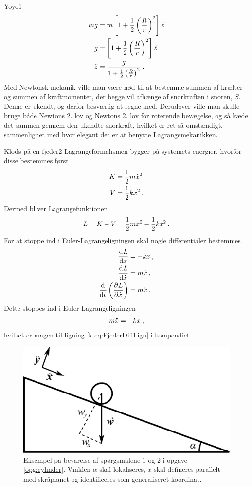 \begin{opgave}{Yoyo}{1}
\begin{align*}
	mg &= m\left[1 + \frac{1}{2}\left(\frac{R}{r}\right)^2\right]\ddt{z} \\
	g &= \left[1 + \frac{1}{2}\left(\frac{R}{r}\right)^2\right]\ddt{z} \\
	\ddt{z} &= \frac{g}{1 + \frac{1}{2}\left(\frac{R}{r}\right)^2} \: .
\end{align*}
\opg Med Newtonsk mekanik ville man være nød til at bestemme summen af kræfter og summen af kraftmomenter, der begge vil afhænge af snorkraften i snoren, $S$. Denne er ukendt, og derfor besværlig at regne med. Derudover ville man skulle bruge både Newtons 2. lov og Newtons 2. lov for roterende bevægelse, og så kæde det sammen gennem den ukendte snorkraft, hvilket er ret så omstændigt, sammenlignet med hvor elegant det er at benytte Lagrangemekanikken.
\end{opgave}
%
%
\begin{opgave}{Klods på en fjeder}{2}
Lagrangeformalismen bygger på systemets energier, hvorfor disse bestemmes først
\begin{align*}
	K &= \frac{1}{2}m\dt{x}^2 \\
	V &= \frac{1}{2}kx^2 \: .
\end{align*}
\opg Dermed bliver Lagrangefunktionen
\begin{align*}
	L = K - V = \frac{1}{2}m\dt{x}^2 - \frac{1}{2}kx^2 \: .
\end{align*}
\opg For at stoppe ind i Euler-Lagrangeligningen skal nogle differentialer bestemmes
\begin{align*}
	\dif{x}{L} &= -kx \: ,\\
	\dif{\dt{x}}{L} &= m\dt{x} \: , \\
	\el{\dt{x}} &= m\ddt{x} \: .
\end{align*}
Dette stoppes ind i Euler-Lagrangeligningen
\begin{align*}
	m\ddt{x} = -kx \: ,
\end{align*}
hvilket er magen til ligning \eqref{k-eq:FjederDiffLign} i kompendiet.
\end{opgave}
%
%
\begin{figure}[t]
\centering
\includegraphics[width=.6\columnwidth]{Analytisk-Mekanik/Cylinder.pdf}
\caption{Eksempel på bevarelse af spørgsmålene 1 og 2 i opgave \ref{opg:cylinder}. Vinklen $\alpha$ skal lokaliseres, $x$ skal defineres parallelt med skråplanet og identificeres som generaliseret koordinat.}
\label{fig:Cylinder}
\end{figure}
